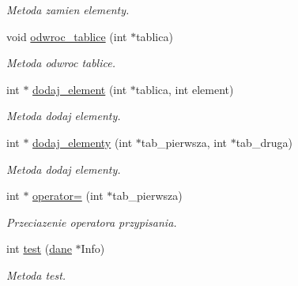 \begin{DoxyCompactItemize}
\begin{DoxyCompactList}\small\item\em Metoda zamien elementy. \end{DoxyCompactList}\item 
void \hyperlink{classalgorytm_acf5c24637c36aed90a4703c23d645e88}{odwroc\-\_\-tablice} (int $\ast$tablica)
\begin{DoxyCompactList}\small\item\em Metoda odwroc tablice. \end{DoxyCompactList}\item 
int $\ast$ \hyperlink{classalgorytm_abba1df6da457b63d6405de3191ecf8fc}{dodaj\-\_\-element} (int $\ast$tablica, int element)
\begin{DoxyCompactList}\small\item\em Metoda dodaj elementy. \end{DoxyCompactList}\item 
int $\ast$ \hyperlink{classalgorytm_a8ea259f4037d0ae2f8d3cffbafd9aa30}{dodaj\-\_\-elementy} (int $\ast$tab\-\_\-pierwsza, int $\ast$tab\-\_\-druga)
\begin{DoxyCompactList}\small\item\em Metoda dodaj elementy. \end{DoxyCompactList}\item 
int $\ast$ \hyperlink{classalgorytm_afc58371cc2a7d9355e03b7e0da204067}{operator=} (int $\ast$tab\-\_\-pierwsza)
\begin{DoxyCompactList}\small\item\em Przeciazenie operatora przypisania. \end{DoxyCompactList}\item 
int \hyperlink{classalgorytm_ac86c17db1372a20261b2eb66530d2775}{test} (\hyperlink{classdane}{dane} $\ast$Info)
\begin{DoxyCompactList}\small\item\em Metoda test. \end{DoxyCompactList}\end{DoxyCompactItemize}
